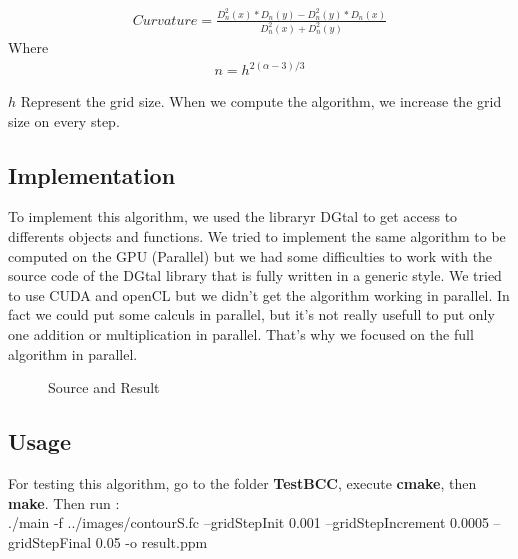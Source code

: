  \begin{align*}
	Curvature =  \frac{ D_{n}^2(x) * D_{n}(y)  -  D_{n}^2(y) * D_{n}(x) }{D_{n}^2(x) + D_{n}^2(y)}
 \end{align*}
Where
  \begin{align*}
	n = h^{2(\alpha - 3)/3}
  \end{align*}

$ h $ Represent the grid size. When we compute the algorithm, we increase the grid size on every step.

\subsection{Implementation}\FloatBarrier
To implement this algorithm, we used the libraryr DGtal to get access to differents objects and functions. We tried to implement the same algorithm to be computed on the GPU (Parallel) but we had some difficulties to work with the source code of the DGtal library that is fully written in a generic style. We tried to use CUDA and openCL but we didn't get the algorithm working in parallel. In fact we could put some calculs in parallel, but it's not really usefull to put only one addition or multiplication in parallel. That's why we focused on the full algorithm in parallel.

\begin{figure}[h]
    \centering
    \qquad
    \caption{Source and Result}
    \label{fig:example}
\end{figure}

\subsection{Usage}
For testing this algorithm, go to the folder \textbf{TestBCC}, execute \textbf{cmake}, then \textbf{make}. Then run :\\
./main -f ../images/contourS.fc --gridStepInit 0.001 --gridStepIncrement  0.0005 --gridStepFinal 0.05 -o result.ppm \\
